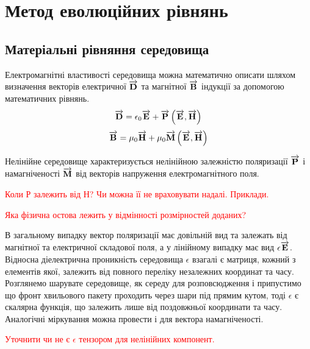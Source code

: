 \chapter{Метод еволюційних рівнянь}
\label{ch:evolution}

\section{Матеріальні рівняння середовища}

Електромагнітні властивості середовища можна математично описати шляхом
визначення векторів електричної $ \overrightarrow{\mathbf D} $ та магнітної $ \overrightarrow{\mathbf B} $ 
індукції за допомогою математичних рівнянь.
%
\begin{equation} \label{eq:MInduct}
\overrightarrow{\mathbf D} = \epsilon_0 \overrightarrow{\mathbf E} + \overrightarrow{\mathbf P} \left( \overrightarrow{\mathbf E},\overrightarrow{\mathbf H} \right)
\end{equation}
%
\begin{equation} \label{eq:EInduct} 
\overrightarrow{\mathbf B} = \mu_0 \overrightarrow{\mathbf H} + \mu_0 \overrightarrow{\mathbf M} \left( \overrightarrow{\mathbf E},\overrightarrow{\mathbf H} \right)
\end{equation}

Нелінійне середовище характеризується нелінійною залежністю поляризації
$ \overrightarrow{\mathbf P} $ і намагніченості $ \overrightarrow{\mathbf M} $ від векторів напруження 
електромагнітного поля. 

\textcolor{red}{Коли Р залежить від Н? Чи можна її не враховувати 
надалі. Приклади.}

\textcolor{red}{Яка фізична остова лежить у відмінності розмірностей доданих?}

В загальному випадку вектор поляризації має довільній вид та залежать від 
магнітної та електричної складової поля, а у лінійному випадку має вид
$ \epsilon \overrightarrow{\mathbf E} $. Відносна діелектрична проникність середовища 
$ \epsilon $ взагалі є матриця, кожний з елементів якої, залежить від 
повного переліку незалежних координат та часу. Розглянемо шарувате середовище, 
як середу для розповсюдження і припустимо що фронт хвильового пакету проходить 
через шари під прямим кутом, тоді $ \epsilon $ є скалярна функція, що залежить 
лише від поздовжньої координати та часу. Аналогічні міркування можна провести 
і для вектора намагніченості.

\textcolor{red}{Уточнити чи не є $ \epsilon $ тензором для нелінійних 
компонент.}

